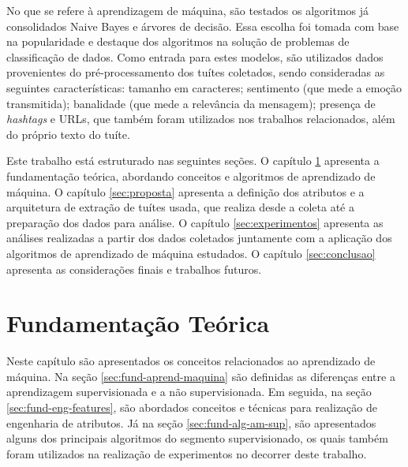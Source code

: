 \documentclass[oneside,openright,12pt]{ufsm_2015} %
\begin{document}
{    \par No que se refere à aprendizagem de máquina, são testados os algoritmos já consolidados Naive Bayes e árvores de decisão. Essa escolha foi tomada com base na popularidade e destaque dos algoritmos na solução de problemas de classificação de dados. Como entrada para estes modelos, são utilizados dados provenientes do pré-processamento dos tuítes coletados, sendo consideradas as seguintes características: tamanho em caracteres; sentimento (que mede a emoção transmitida); banalidade (que mede a relevância da mensagem); presença de \textit{hashtags} e URLs, que também foram utilizados nos trabalhos relacionados, além do próprio texto do tuíte.

    \par Este trabalho está estruturado nas seguintes seções. O capítulo \ref{sec:fund-teorica} apresenta a fundamentação teórica, abordando conceitos e algoritmos de aprendizado de máquina. O capítulo \ref{sec:proposta} apresenta a definição dos atributos e a arquitetura de extração de tuítes usada, que realiza desde a coleta até a preparação dos dados para análise. O capítulo \ref{sec:experimentos} apresenta as análises realizadas a partir dos dados coletados juntamente com a aplicação dos algoritmos de aprendizado de máquina estudados. O capítulo \ref{sec:conclusao} apresenta as considerações finais e trabalhos futuros.


}
\geraintro  %


\chapter{Fundamentação Teórica}
\label{sec:fund-teorica}

    \par Neste capítulo são apresentados os conceitos relacionados ao aprendizado de máquina. Na seção \ref{sec:fund-aprend-maquina} são definidas as diferenças entre a aprendizagem supervisionada e a não supervisionada. Em seguida, na seção \ref{sec:fund-eng-features}, são abordados conceitos e técnicas para realização de engenharia de atributos. Já na seção \ref{sec:fund-alg-am-sup}, são apresentados alguns dos principais algoritmos do segmento supervisionado, os quais também foram utilizados na realização de experimentos no decorrer deste trabalho.
\end{document}

